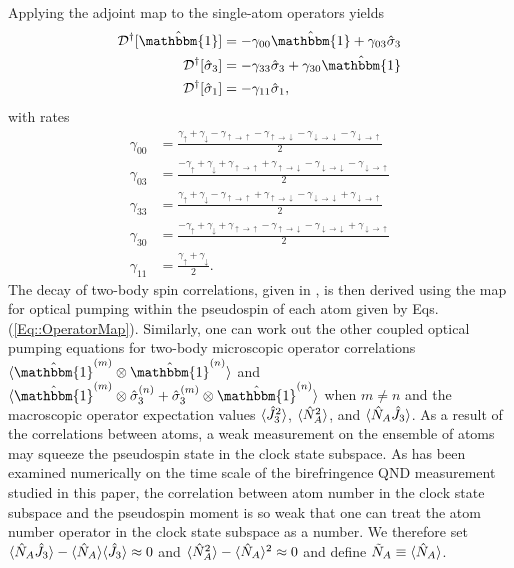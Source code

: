 \documentclass[preprint, aps,pra,onecolumn]{revtex4-1} %
\newcommand{\NA}{\tilde{N}_A}
\newcommand{\gammauu}{\gamma_{\uparrow \rightarrow \uparrow}}
\newcommand{\gammadd}{\gamma_{\downarrow \rightarrow \downarrow}}
\newcommand{\gammaud}{\gamma_{\uparrow \rightarrow \downarrow}}
\newcommand{\gammadu}{\gamma_{\downarrow \rightarrow \uparrow}}
\begin{document}
\begin{appendix}
Applying the adjoint map to the single-atom operators yields 
	\begin{subequations} \label{Eq::OperatorMap}
	\begin{align}
		\mathcal{D}\dg[\hat{\mathbbm{1}}] & = - \gamma_{00} \hat{\mathbbm{1}} +\gamma_{03} \hat{\sigma}_3 \label {Eq::Idecay} \\
		\mathcal{D}\dg[\hat{\sigma}_3] & =- \gamma_{33} \hat{\sigma}_3 +  \gamma_{30} \hat{\mathbbm{1}} 
\label{Eq::zdecay} \\
		\mathcal{D}\dg[\hat{\sigma}_1] & = - \gamma_{11} \hat{\sigma}_1\label{Eq::xdecay},
	\end{align}
	\end{subequations}
with rates	
	\begin{subequations} \label{Eq::DecayRates}
	\begin{align}
		\gamma_{00} 
			& = \frac{\gamma_{\uparrow}+\gamma_{\downarrow} - \gammauu-\gammaud  -\gammadd-\gammadu}{2} \\
			\gamma_{03} 
			& = \frac{-\gamma_{\uparrow}+\gamma_{\downarrow} +\gammauu + \gammaud - \gammadd - \gammadu }{2}\\		
		\gamma_{33} 
			& = \frac{\gamma_{\uparrow}+\gamma_{\downarrow} - \gammauu+\gammaud  -\gammadd+\gammadu}{2}\\
			\gamma_{30} 
			& = \frac{-\gamma_{\uparrow} + \gamma_{\downarrow} + \gammauu - \gammaud - \gammadd + \gammadu }{2} \\
			\gamma_{11} 
			& = \frac{\gamma_{\uparrow}+\gamma_{\downarrow}}{2}. \label{Eq::frate}
	\end{align}
	\end{subequations}
The decay of two-body spin correlations, given in , is then derived using the map for optical pumping within the pseudospin of each atom given by Eqs. (\ref{Eq::OperatorMap}).  
Similarly, one can work out the other coupled optical pumping equations for two-body microscopic operator correlations $ \expt{\hat{\mathbbm{1}}^{(m)} \otimes \hat{\mathbbm{1}}^{(n)}} $ and $ \expt{\hat{\mathbbm{1}}^{(m)} \otimes \hat{\sigma}_3^{(n)} + \hat{\sigma}_3^{(m)} \otimes \hat{\mathbbm{1}}^{(n)} } $ when $ m\neq n $ and the macroscopic operator expectation values $ \langle{\hat{J}_3^2}\rangle $, $ \langle{\hat{N}_A^2}\rangle $, and $ \langle{\hat{N}_A\hat{J}_3}\rangle $. 
As a result of the correlations between atoms, a weak measurement on the ensemble of atoms may squeeze the pseudospin state in the clock state subspace. 
As has been examined numerically on the time scale of the birefringence QND measurement studied in this paper, the correlation between atom number in the clock state subspace and the pseudospin moment is so weak that one can treat the atom number operator in the clock state subspace as a number.
We therefore set $ \langle{\hat{N}_A\hat{J}_3}\rangle-\langle{\hat{N}_A}\rangle\langle{\hat{J}_3}\rangle\approx 0 $ and $ \langle{\hat{N}_A^2}\rangle - \langle{\hat{N}_A}\rangle^2 \approx 0 $ and define $ \NA\equiv \expt{\hat{N}_A}$. 


\end{appendix}
\end{document}
